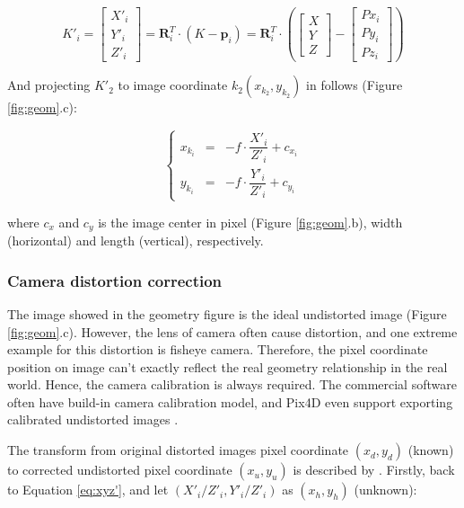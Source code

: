 \documentclass[doublespacing]{configs/bmcart}
\begin{document}
\begin{equation} \label{eq:ki'}
K'_i = 
  \left[
    \begin{array}{c} X'_i \\ Y'_i \\ Z'_i \end{array} 
  \right]
  =
  \mathbf{R}_i^T \cdot (K - \mathbf{p}_i)
  =
  \mathbf{R}_i^T \cdot
  \left(
    \left[\begin{matrix} X \\ Y \\ Z \end{matrix}\right] - 
    \left[\begin{matrix} Px_i \\ Py_i \\ Pz_i \end{matrix}\right]
  \right)
\end{equation}

And projecting $K'_2$ to image coordinate $k_2 (x_{k_2}, y_{k_2})$ in follows \cite{pix4d_support_how_2020} (Figure \ref{fig:geom}.c):

\begin{equation}  \label{eq:xyz'}
  \left\{
  \begin{matrix}
    x_{k_i}  & = & - f \cdot \dfrac{X'_i}{Z'_i} + c_{x_i} \\
    y_{k_i}  & = & - f \cdot \dfrac{Y'_i}{Z'_i} + c_{y_i}
  \end{matrix}
  \right.
\end{equation}

where $c_x$ and $c_y$ is the image center in pixel (Figure \ref{fig:geom}.b), width (horizontal) and length (vertical), respectively. 

\subsubsection*{Camera distortion correction}
The image showed in the geometry figure is the ideal undistorted image (Figure \ref{fig:geom}.c). However, the lens of camera often cause distortion, and one extreme example for this distortion is fisheye camera. Therefore, the pixel coordinate position on image can't exactly reflect the real geometry relationship in the real world. Hence, the camera calibration is always required. The commercial software often have build-in camera calibration model, and Pix4D even support exporting calibrated undistorted images \cite{pix4d_support_menu_2020}. 

The transform from original distorted images pixel coordinate $(x_d, y_d)$ (known) to corrected undistorted pixel coordinate $(x_u, y_u)$ is described by \cite{pix4d_support_how_2020}. Firstly, back to Equation \ref{eq:xyz'}, and let $(X'_i / Z'_i, Y'_i / Z'_i)$ as $(x_h, y_h)$ (unknown):
\end{document}
